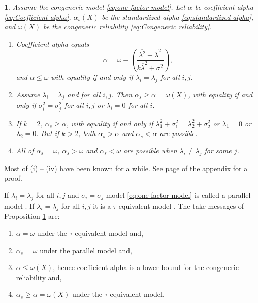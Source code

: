 \documentclass{article}
\makeatletter
\theoremstyle{plain}
\theoremstyle{plain}
\theoremstyle{definition}
\theoremstyle{remark}
\theoremstyle{definition}
\theoremstyle{plain}
\theoremstyle{plain}
\newtheorem{prop}[thm]{\protect\propositionname}
\theoremstyle{definition}
\newenvironment{proof}[1][\protect\proofname]{\par
	\normalfont\topsep6\p@\@plus6\p@\relax
	\trivlist
	\itemindent\parindent
	\item[\hskip\labelsep\scshape #1]\ignorespaces
}{%
	\endtrivlist\@endpefalse
}
\providecommand{\proofname}{Proof}
\providecommand{\propositionname}{Proposition}
\makeatother
\begin{document}
\begin{prop}
\label{prop:Reliabilities.}Assume the congeneric model \eqref{eq:one-factor model}. Let $\alpha$ be coefficient alpha \eqref{eq:Coefficient alpha}, $\alpha_{s}(X)$ be the standardized alpha \eqref{eq:standardized alpha}, and  $\omega(X)$ be the congeneric reliability \eqref{eq:Congeneric reliability}. 
\begin{enumerate}[label=(\roman*)]
\item Coefficient alpha equals $$\alpha=\omega-\left(\frac{\overline{\lambda^{2}}-\overline{\lambda}^{2}}{k\overline{\lambda}^{2}+\overline{\sigma^{2}}}\right),$$
and $\alpha\leq\omega$ with equality
if and only if $\lambda_{i}=\lambda_{j}$ for all $i,j$.
\item Assume $\lambda_{i}=\lambda_{j}$ and for all $i,j$. Then $\alpha_s \geq \alpha = \omega(X)$, with equality if and only if $\sigma_{i}^{2}=\sigma_{j}^{2}$ for all $i,j$ or $\lambda_i = 0$ for all $i$.
\item If $k=2$, $\alpha_s\geq\alpha$, with equality if and only if $\lambda_{1}^{2}+\sigma_{1}^{2}=\lambda_{2}^{2}+\sigma_{2}^{2}$ or $\lambda_1 = 0$ or $\lambda_2 = 0$. But if $k>2$, both $\alpha_s>\alpha$
and $\alpha_s<\alpha$ are possible.
\item All of $\alpha_{s}=\omega$, $\alpha_{s}>\omega$ and $\alpha_{s}<\omega$
are possible when $\lambda_{i}\neq\lambda_{j}$ for some $j$.
\end{enumerate}
\end{prop}
\begin{proof}
Most of (i) -- (iv) have been known for a while. See page \pageref{proof:Reliabilities.} of the appendix for a proof.
\end{proof}

If $\lambda_{i}=\lambda_{j}$ for all $i,j$ and $\sigma_{i}=\sigma_{j}$
model \eqref{eq:one-factor model} is called a parallel model \citep[][section 2.13]{Lord1968-ax}. If $\lambda_{i}=\lambda_{j}$
for all $i,j$ it is a $\tau$-equivalent model \citep[][section 2.13]{Lord1968-ax}. The take-messages of Proposition \ref{prop:Reliabilities.} are:

\begin{enumerate}[label=(\alph*)]
\item $\alpha = \omega$ under the $\tau$-equivalent model and,
\item $\alpha_s = \omega$ under the parallel model and,
\item $\alpha \leq \omega(X)$, hence coefficient alpha is a lower bound for the congeneric reliability and,
\item $\alpha_s \geq \alpha = \omega(X)$ under the $\tau$-equivalent model.
\end{enumerate}
\end{document}
